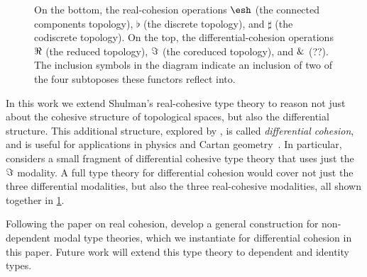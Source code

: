 \documentclass{article}
\begin{document}
\begin{figure}
\begin{center}
\end{center}
\caption{On the bottom, the real-cohesion operations $\shape$ (the connected
  components topology), $\flat$ (the discrete topology), and $\sharp$ (the
  codiscrete topology). On the top, the differential-cohesion operations $\Re$
  (the reduced topology), $\Im$ (the coreduced topology), and $\&$ (??).
   The inclusion symbols in the diagram indicate an
  inclusion of two of the four subtoposes these functors reflect into. }
\label{fig:modalities}
\end{figure}

In this work we extend Shulman's real-cohesive type theory to reason not just
about the cohesive structure of topological spaces, but also the differential
structure. This additional structure, explored by \citet{Schreiber2013}, is
called \emph{differential cohesion}, and is useful for applications in physics
and Cartan geometry~\citep{Wellen2017}. In particular, \citeauthor{Wellen2017}
considers a small fragment of differential cohesive type theory that uses just
the $\Im$ modality. A full type theory for differential cohesion would cover
not just the three differential modalities, but also the three real-cohesive
modalities, all shown together in \cref{fig:modalities}.

Following the \citeyear{Licata2016} paper on real cohesion, \citet{Licata2017}
develop a general construction for non-dependent modal type theories, which we
instantiate for differential cohesion in this paper. Future work will extend
this type theory to dependent and identity types.
\end{document}
